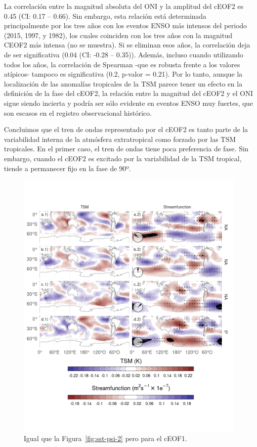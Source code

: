 \documentclass[12pt,oneside]{reedthesis}
\begin{document}
La correlación entre la magnitud absoluta del ONI y la amplitud del cEOF2 es 0.45 (CI: 0.17 -- 0.66).
Sin embargo, esta relación está determinada principalmente por los tres años con los eventos ENSO más intensos del periodo (2015, 1997, y 1982), los cuales coinciden con los tres años con la magnitud CEOF2 más intensa (no se muestra).
Si se eliminan esos años, la correlación deja de ser significativa (0.04 (CI: -0.28 -- 0.35)).
Además, incluso cuando utilizando todos los años, la correlación de Spearman -que es robusta frente a los valores atípicos- tampoco es significativa (0.2, p-valor = 0.21).
Por lo tanto, aunque la localización de las anomalías tropicales de la TSM parece tener un efecto en la definición de la fase del cEOF2, la relación entre la magnitud del cEOF2 y el ONI sigue siendo incierta y podría ser sólo evidente en eventos ENSO muy fuertes, que son escasos en el registro observacional histórico.

Concluimos que el tren de ondas representado por el cEOF2 es tanto parte de la variabilidad interna de la atmósfera extratropical como forzado por las TSM tropicales.
En el primer caso, el tren de ondas tiene poca preferencia de fase.
Sin embargo, cuando el cEOF2 es excitado por la variabilidad de la TSM tropical, tiende a permanecer fijo en la fase de 90º.



\begin{figure}
\includegraphics{figures/20-ceofs/sst-psi-1-1} \caption{Igual que la Figura~\ref{fig:sst-psi-2} pero para el cEOF1.}\label{fig:sst-psi-1}
\end{figure}
\end{document}
